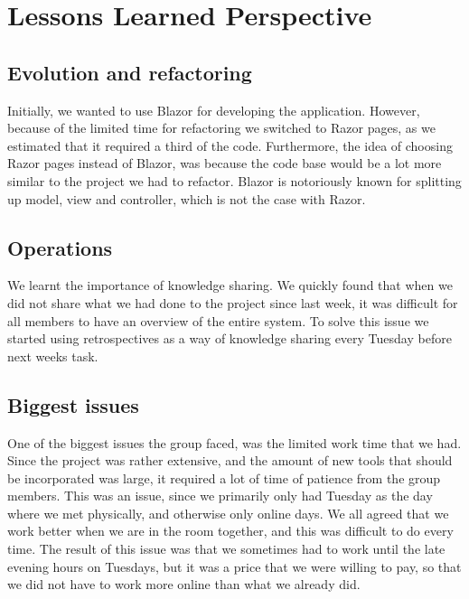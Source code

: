 \newpage
\section{Lessons Learned Perspective}






\subsection{Evolution and refactoring}
Initially, we wanted to use Blazor for developing the application. However, because of the limited time for refactoring we switched to Razor pages, as we estimated that it required a third of the code. Furthermore, the idea of choosing Razor pages instead of Blazor, was because the code base would be a lot more similar to the project we had to refactor. Blazor is notoriously known for splitting up model, view and controller, which is not the case with Razor.

\subsection{Operations}
We learnt the importance of knowledge sharing. We quickly found that when we did not share what we had done to the project since last week, it was difficult for all members to have an overview of the entire system. To solve this issue we started using retrospectives as a way of knowledge sharing every Tuesday before next weeks task.

\subsection{Biggest issues}
One of the biggest issues the group faced, was the limited work time that we had. Since the project was rather extensive, and the amount of new tools that should be incorporated was large, it required a lot of time of patience from the group members. This was an issue, since we primarily only had Tuesday as the day where we met physically, and otherwise only online days. We all agreed that we work better when we are in the room together, and this was difficult to do every time. The result of this issue was that we sometimes had to work until the late evening hours on Tuesdays, but it was a price that we were willing to pay, so that we did not have to work more online than what we already did.

